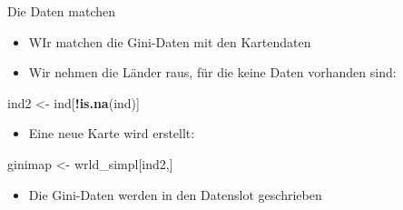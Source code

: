 \documentclass[ignorenonframetext,]{beamer}
\newenvironment{Shaded}{\begin{snugshade}}{\end{snugshade}}
\newcommand{\KeywordTok}[1]{\textcolor[rgb]{0.13,0.29,0.53}{\textbf{#1}}}
\newcommand{\StringTok}[1]{\textcolor[rgb]{0.31,0.60,0.02}{#1}}
\newcommand{\OperatorTok}[1]{\textcolor[rgb]{0.81,0.36,0.00}{\textbf{#1}}}
\newcommand{\NormalTok}[1]{#1}
\providecommand{\tightlist}{%
  \setlength{\itemsep}{0pt}\setlength{\parskip}{0pt}}
\begin{document}
\begin{frame}[fragile]{Die Daten matchen}

\begin{itemize}
\tightlist
\item
  WIr matchen die Gini-Daten mit den Kartendaten
\end{itemize}

\begin{Shaded}
\end{Shaded}

\begin{itemize}
\tightlist
\item
  Wir nehmen die Länder raus, für die keine Daten vorhanden sind:
\end{itemize}

\begin{Shaded}
\begin{Highlighting}[]
\NormalTok{ind2 <-}\StringTok{ }\NormalTok{ind[}\OperatorTok{!}\KeywordTok{is.na}\NormalTok{(ind)]}
\end{Highlighting}
\end{Shaded}

\begin{itemize}
\tightlist
\item
  Eine neue Karte wird erstellt:
\end{itemize}

\begin{Shaded}
\begin{Highlighting}[]
\NormalTok{ginimap <-}\StringTok{ }\NormalTok{wrld_simpl[ind2,]}
\end{Highlighting}
\end{Shaded}

\begin{itemize}
\tightlist
\item
  Die Gini-Daten werden in den Datenslot geschrieben
\end{itemize}

\begin{Shaded}
\end{Shaded}

\end{frame}
\end{document}
